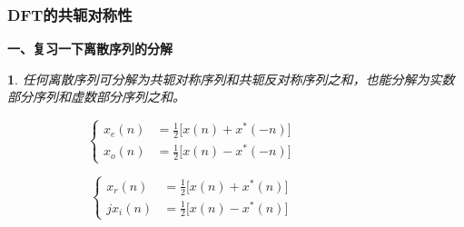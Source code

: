 \documentclass[notheorems,compress,mathserif,table]{beamer}
\newtheorem{dablock}{}
\begin{document}
\begin{frame}[shrink]\frametitle{DFT的共轭对称性}%
\textbf{一、复习一下离散序列的分解}
\begin{dablock}
任何离散序列可分解为共轭对称序列和共轭反对称序列之和，也能分解为实数部分序列和虚数部分序列之和。
\end{dablock}




\begin{equation*} %
\left\{ \begin{aligned}
    x_{e}(n) &= \frac{1}{2}\big[x(n) + x^{*}(-n)\big]  \quad\quad\quad\quad\quad\quad\quad\\
    x_{o}(n) &= \frac{1}{2}\big[x(n) - x^{*}(-n)\big]
\end{aligned} \right.
\end{equation*}

\begin{equation*} %
\left\{ \begin{aligned}
    x_{r}(n)  &= \frac{1}{2}\big[x(n) + x^{*}(n)\big]   \quad\quad\quad\quad\quad\quad\quad\\
    jx_{i}(n) &= \frac{1}{2}\big[x(n) - x^{*}(n)\big]
\end{aligned} \right.
\end{equation*}
\end{frame}
\end{document}

